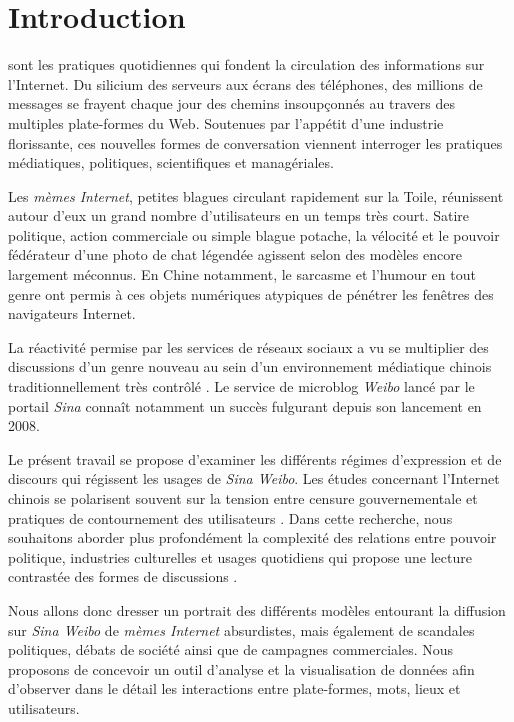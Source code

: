 \chapter*{Introduction}


 sont les pratiques quotidiennes qui fondent la circulation des informations sur l'Internet. Du silicium des serveurs aux écrans des téléphones, des millions de messages se frayent chaque jour des chemins insoupçonnés au travers des multiples plate-formes du Web. Soutenues par l'appétit d'une industrie florissante, ces nouvelles formes de conversation viennent interroger les pratiques médiatiques, politiques, scientifiques et managériales. 

Les \textit{mèmes Internet}, petites blagues circulant rapidement sur la Toile, réunissent autour d'eux un grand nombre d'utilisateurs en un temps très court. Satire politique, action commerciale ou simple blague potache, la vélocité et le pouvoir fédérateur d'une photo de chat légendée agissent selon des modèles encore largement méconnus. En Chine notamment, le sarcasme et l'humour en tout genre ont permis à ces objets numériques atypiques de pénétrer les fenêtres des navigateurs Internet.

La réactivité permise par les services de réseaux sociaux a vu se multiplier des discussions d'un genre nouveau au sein d'un environnement médiatique chinois traditionnellement très contrôlé \citep{MacKinnon2009, Douzet2007, Yang2008}. Le service de microblog \textit{Weibo} lancé par le portail \textit{Sina} connaît notamment un succès fulgurant depuis son lancement en 2008.

Le présent travail se propose d'examiner les différents régimes d'expression et de discours qui régissent les usages de \textit{Sina Weibo}. Les études concernant l'Internet chinois se polarisent souvent sur la tension entre censure gouvernementale \citep{Ng2013a} et pratiques de contournement des utilisateurs \citep{Yang2014}. Dans cette recherche, nous souhaitons aborder plus profondément la complexité des relations entre pouvoir politique, industries culturelles et usages quotidiens qui propose une lecture contrastée des formes de discussions \citep{Fernandez2010}.

Nous allons donc dresser un portrait des différents modèles entourant la  diffusion sur \textit{Sina Weibo} de \textit{mèmes Internet} absurdistes, mais également de scandales politiques, débats de société ainsi que de campagnes commerciales. Nous proposons de concevoir un outil d'analyse et la visualisation de données afin d'observer dans le détail les interactions entre plate-formes, mots, lieux et utilisateurs.


